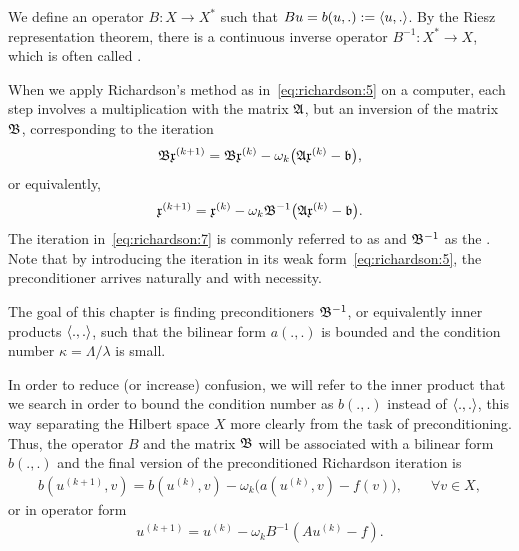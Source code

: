 \begin{note}
  We define an operator $B:X\to X^*$ such that $Bu = b(u,.) :=
  \scal(u,.)$. By the Riesz representation theorem, there is a
  continuous inverse operator $B^{-1}: X^*\to X$, which is often
  called .
\end{note}

\begin{definition}
  \label{definition:richardson:2}
  When we apply Richardson's method as in~\eqref{eq:richardson:5} on a
  computer, each step involves a multiplication with the matrix $\mathfrak{A}$,
  but an inversion of the matrix $\mathfrak{B}$, corresponding to the iteration
  \begin{gather*}
    \mathfrak{B} \mathfrak{x}^{(k+1)}
    = \mathfrak{B} \mathfrak{x}^{(k)}
    - \omega_k \bigl(\mathfrak{A} \mathfrak{x}^{(k)} - \mathfrak{b} \bigr),
  \end{gather*}
  or equivalently,
  \begin{gather}
    \label{eq:richardson:7}
    \mathfrak{x}^{(k+1)}
    = \mathfrak{x}^{(k)}
    - \omega_k \mathfrak{B}^{-1}\bigl(\mathfrak{A} \mathfrak{x}^{(k)} - \mathfrak{b} \bigr).
  \end{gather}
  The iteration in~\eqref{eq:richardson:7} is commonly referred to as
   and $\mathfrak{B}^{-1}$ as the
  . Note that by introducing the iteration in
  its weak form~\eqref{eq:richardson:5}, the preconditioner arrives
  naturally and with necessity.
  
  The goal of this chapter is finding preconditioners $\mathfrak{B}^{-1}$, or
  equivalently inner products $\scal(.,.)$, such that the bilinear
  form $a(.,.)$ is bounded and the condition number
  $\kappa = \Lambda/\lambda$ is small.
  
  In order to reduce (or increase) confusion, we will refer to the
  inner product that we search in order to bound the condition number
  as $b(.,.)$ instead of $\scal(.,.)$, this way separating the
  Hilbert space $X$ more clearly from the task of
  preconditioning. Thus, the operator $B$ and the matrix $\mathfrak{B}$ will
  be associated with a bilinear form $b(.,.)$ and the final version of
  the preconditioned Richardson iteration is
  \begin{gather}
    \label{eq:richardson:10}
    b(u^{(k+1)},v) = b(u^{(k)},v)
    - \omega_k \bigl(a(u^{(k)},v) - f(v)\bigr), \qquad \forall v\in X,
  \end{gather}
  or in operator form
  \begin{gather}
    \label{eq:richardson:11}
    u^{(k+1)} = u^{(k)} - \omega_k B^{-1} (A u^{(k)} - f).
  \end{gather}
\end{definition}

